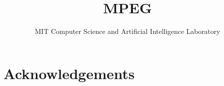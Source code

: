 \documentclass[times,12pt,onecolumn]{article}
\title{MPEG}
\author{
  MIT Computer Science and Artificial Intelligence Laboratory
}
\date{}
\begin{document}
\maketitle
\thispagestyle{empty}

\begin{abstract}

\end{abstract}











\section*{Acknowledgements}



\end{document}
